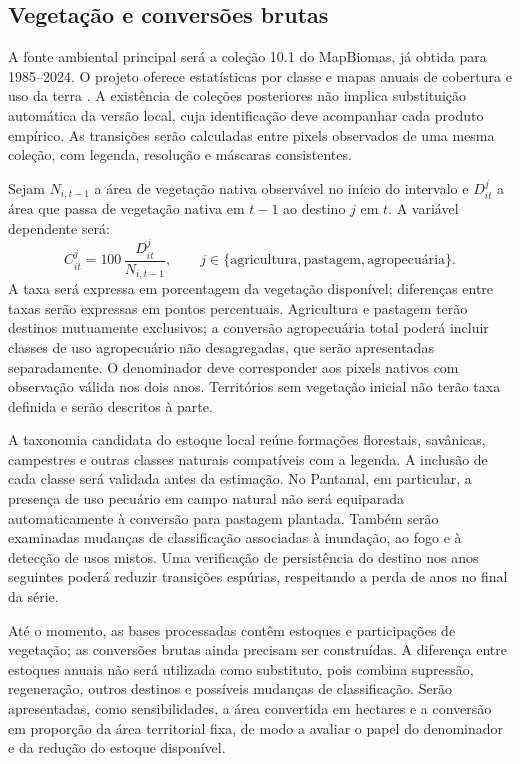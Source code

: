 \subsection{Vegetação e conversões brutas}

A fonte ambiental principal será a coleção 10.1 do MapBiomas, já obtida para 1985--2024. O projeto oferece estatísticas por classe e mapas anuais de cobertura e uso da terra \cite{MapBiomas2026}. A existência de coleções posteriores não implica substituição automática da versão local, cuja identificação deve acompanhar cada produto empírico. As transições serão calculadas entre pixels observados de uma mesma coleção, com legenda, resolução e máscaras consistentes.

Sejam $N_{i,t-1}$ a área de vegetação nativa observável no início do intervalo e $D_{it}^{j}$ a área que passa de vegetação nativa em $t-1$ ao destino $j$ em $t$. A variável dependente será:
\begin{equation}
 C_{it}^{j}=100\,\frac{D_{it}^{j}}{N_{i,t-1}},
 \qquad j\in\{\text{agricultura},\text{pastagem},\text{agropecuária}\}.
 \label{eq:conversao}
\end{equation}
A taxa será expressa em porcentagem da vegetação disponível; diferenças entre taxas serão expressas em pontos percentuais. Agricultura e pastagem terão destinos mutuamente exclusivos; a conversão agropecuária total poderá incluir classes de uso agropecuário não desagregadas, que serão apresentadas separadamente. O denominador deve corresponder aos pixels nativos com observação válida nos dois anos. Territórios sem vegetação inicial não terão taxa definida e serão descritos à parte.

A taxonomia candidata do estoque local reúne formações florestais, savânicas, campestres e outras classes naturais compatíveis com a legenda. A inclusão de cada classe será validada antes da estimação. No Pantanal, em particular, a presença de uso pecuário em campo natural não será equiparada automaticamente à conversão para pastagem plantada. Também serão examinadas mudanças de classificação associadas à inundação, ao fogo e à detecção de usos mistos. Uma verificação de persistência do destino nos anos seguintes poderá reduzir transições espúrias, respeitando a perda de anos no final da série.

Até o momento, as bases processadas contêm estoques e participações de vegetação; as conversões brutas ainda precisam ser construídas. A diferença entre estoques anuais não será utilizada como substituto, pois combina supressão, regeneração, outros destinos e possíveis mudanças de classificação. Serão apresentadas, como sensibilidades, a área convertida em hectares e a conversão em proporção da área territorial fixa, de modo a avaliar o papel do denominador e da redução do estoque disponível.

